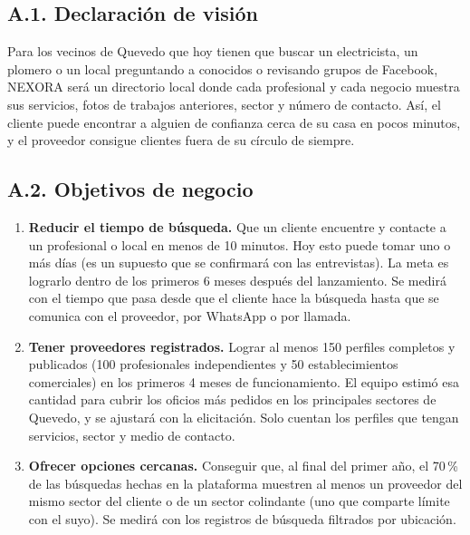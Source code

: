 \documentclass[11pt,a4paper]{article}
\begin{document}
\subsection*{A.1. Declaraci\'on de visi\'on}

Para los vecinos de Quevedo que hoy tienen que buscar un electricista, un plomero o un local preguntando a conocidos o revisando grupos de Facebook, NEXORA ser\'a un directorio local donde cada profesional y cada negocio muestra sus servicios, fotos de trabajos anteriores, sector y n\'umero de contacto. As\'i, el cliente puede encontrar a alguien de confianza cerca de su casa en pocos minutos, y el proveedor consigue clientes fuera de su c\'irculo de siempre.

\subsection*{A.2. Objetivos de negocio}

\begin{enumerate}[label=\textbf{OB-\arabic*.}, leftmargin=3.2em, itemsep=4pt]
    \item \textbf{Reducir el tiempo de b\'usqueda.} Que un cliente encuentre y contacte a un profesional o local en menos de 10 minutos. Hoy esto puede tomar uno o m\'as d\'ias (es un supuesto que se confirmar\'a con las entrevistas). La meta es lograrlo dentro de los primeros 6 meses despu\'es del lanzamiento. Se medir\'a con el tiempo que pasa desde que el cliente hace la b\'usqueda hasta que se comunica con el proveedor, por WhatsApp o por llamada.
    \item \textbf{Tener proveedores registrados.} Lograr al menos 150 perfiles completos y publicados (100 profesionales independientes y 50 establecimientos comerciales) en los primeros 4 meses de funcionamiento. El equipo estim\'o esa cantidad para cubrir los oficios m\'as pedidos en los principales sectores de Quevedo, y se ajustar\'a con la elicitaci\'on. Solo cuentan los perfiles que tengan servicios, sector y medio de contacto.
    \item \textbf{Ofrecer opciones cercanas.} Conseguir que, al final del primer a\~no, el 70\,\% de las b\'usquedas hechas en la plataforma muestren al menos un proveedor del mismo sector del cliente o de un sector colindante (uno que comparte l\'imite con el suyo). Se medir\'a con los registros de b\'usqueda filtrados por ubicaci\'on.
\end{enumerate}
\end{document}
